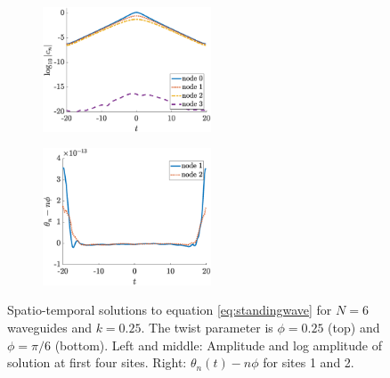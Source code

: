\documentclass[11pt,reqno]{amsart}
\begin{document}
\begin{figure}
\begin{subfigure}{0.3\linewidth}
    \end{subfigure}
    \begin{subfigure}{0.3\linewidth}
        \caption{}
        \label{fig:m6pi6logamp}
        \includegraphics[width=5cm]{m6phipi6logamp.eps}
    \end{subfigure}
        \begin{subfigure}{0.3\linewidth}
        \caption{}
        \label{fig:m6pi6phase}
        \includegraphics[width=5cm]{m6phipi6phase.eps}
    \end{subfigure}
    \caption{Spatio-temporal solutions to equation \cref{eq:standingwave} for $N=6$ waveguides and $k=0.25$. The twist parameter is $\phi = 0.25$ (top) and $\phi = \pi/6$ (bottom). Left and middle: Amplitude and log amplitude of solution at first four sites. Right: $\theta_n(t) - n \phi$ for sites 1 and 2.}
    \label{fig:m6sol}
\end{figure}
\end{document}
